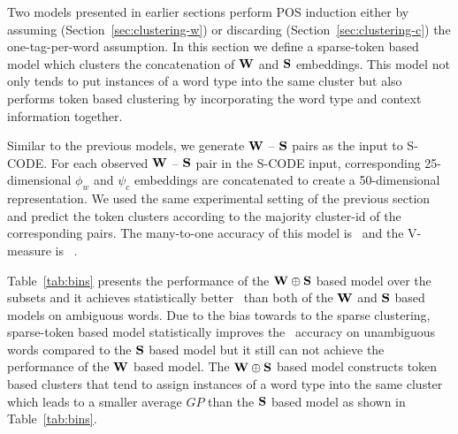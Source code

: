 Two models presented in earlier sections perform POS induction either
by assuming (Section~\ref{sec:clustering-w}) or discarding
(Section~\ref{sec:clustering-c}) the one-tag-per-word assumption.  In
this section we define a sparse-token based model which clusters the
concatenation of ${\bf W}$ and ${\bf S}$ embeddings.  This model not
only tends to put instances of a word type into the same cluster but
also performs token based clustering by incorporating the word type
and context information together.

Similar to the previous models, we generate ${\bf W}$ -- ${\bf S}$
pairs as the input to S-CODE.  For each observed ${\bf W}$ -- ${\bf
  S}$ pair in the S-CODE input, corresponding 25-dimensional $\phi_w$
and $\psi_c$ embeddings are concatenated to create a 50-dimensional
representation.  We used the same experimental setting of the previous
section and predict the token clusters according to the majority
cluster-id of the corresponding pairs.  The many-to-one accuracy of
this model is \wsxymto\ and the V-measure is \wsxyvm\ .

Table~\ref{tab:bins} presents the performance of the ${\bf
  W}\oplus{\bf S}$ based model over the subsets and it achieves
statistically better \mto\ than both of the ${\bf W}$ and ${\bf S}$
based models on ambiguous words.  Due to the bias towards to the
sparse clustering, sparse-token based model statistically improves the
\mto\ accuracy on unambiguous words compared to the ${\bf S}$ based
model but it still can not achieve the performance of the ${\bf W}$
based model.  The ${\bf W}\oplus{\bf S}$ based model constructs token
based clusters that tend to assign instances of a word type into the
same cluster which leads to a smaller average $GP$ than the ${\bf S}$
based model as shown in Table~\ref{tab:bins}.

